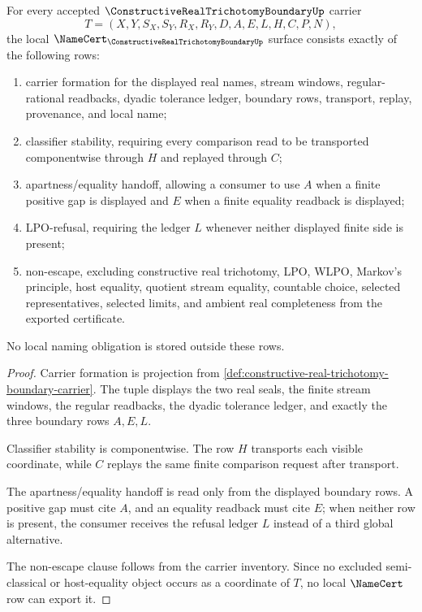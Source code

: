 \begin{theorem}
\label{thm:constructive-real-trichotomy-boundary-namecert-obligations}
For every accepted $\ConstructiveRealTrichotomyBoundaryUp$ carrier
$$
T=(X,Y,S_X,S_Y,R_X,R_Y,D,A,E,L,H,C,P,N),
$$
the local $\NameCert_{\ConstructiveRealTrichotomyBoundaryUp}$ surface consists exactly of the following rows:
\begin{enumerate}
\item carrier formation for the displayed real names, stream windows, regular-rational readbacks, dyadic tolerance ledger, boundary rows, transport, replay, provenance, and local name;
\item classifier stability, requiring every comparison read to be transported componentwise through $H$ and replayed through $C$;
\item apartness/equality handoff, allowing a consumer to use $A$ when a finite positive gap is displayed and $E$ when a finite equality readback is displayed;
\item LPO-refusal, requiring the ledger $L$ whenever neither displayed finite side is present;
\item non-escape, excluding constructive real trichotomy, LPO, WLPO, Markov's principle, host equality, quotient stream equality, countable choice, selected representatives, selected limits, and ambient real completeness from the exported certificate.
\end{enumerate}
No local naming obligation is stored outside these rows.
\end{theorem}
\begin{proof}
Carrier formation is projection from \autoref{def:constructive-real-trichotomy-boundary-carrier}. The tuple displays the two real seals, the finite stream windows, the regular readbacks, the dyadic tolerance ledger, and exactly the three boundary rows $A,E,L$.

Classifier stability is componentwise. The row $H$ transports each visible coordinate, while $C$ replays the same finite comparison request after transport.

The apartness/equality handoff is read only from the displayed boundary rows. A positive gap must cite $A$, and an equality readback must cite $E$; when neither row is present, the consumer receives the refusal ledger $L$ instead of a third global alternative.

The non-escape clause follows from the carrier inventory. Since no excluded semi-classical or host-equality object occurs as a coordinate of $T$, no local $\NameCert$ row can export it.
\end{proof}

